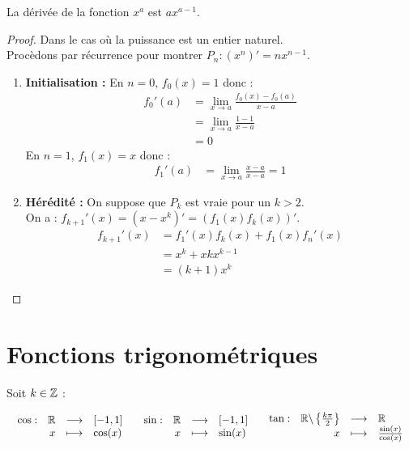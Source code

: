 \begin{proposition}
	La dérivée de la fonction $x^a$ est $ax^{a-1}$.
\end{proposition}

\begin{proof}
	Dans le cas où la puissance est un entier naturel. \\
	Procèdons par récurrence pour montrer $P_n : (x^n)' = nx^{n-1}$.
	\begin{enumerate}
		\item \textbf{Initialisation :} En $n = 0$, $f_0(x) = 1$ donc :
		\begin{align*}
			f_0'(a) &= \lim_{x \to a} \frac{f_0(x) - f_0(a)}{x - a} \\
			 &= \lim_{x \to a} \frac{1 - 1}{x - a} \\
			 &= 0
		\end{align*}
		En $n = 1$, $f_1(x) = x$ donc :
		\begin{align*}
			f_1'(a) &= \lim_{x \to a} \frac{x - a}{x - a} = 1
		\end{align*}
		\item \textbf{Hérédité :} On suppose que $P_k$ est vraie pour un $k > 2$. \\
		On a : $f_{k+1}'(x) = (x - x^k)' = (f_1(x) f_k(x))'$.
		\begin{align*}
			f_{k+1}'(x) &= f_1'(x) f_k(x) + f_1(x) f_n'(x) \\
			&= x^k + xkx^{k-1} \\
			&= (k+1)x^k 
		\end{align*}
	\end{enumerate}
\end{proof}

\section{Fonctions trigonométriques}
\begin{definition}
	Soit $k \in \mathbb{Z}$ :	
	\begin{center}
		$
		\begin{array}{ccc}
			\begin{array}{rrcl} \cos : & \mathbb{R} & \longrightarrow & [-1,1] \\ & x & \longmapsto & \cos(x) \end{array}
			&
			\begin{array}{rrcl} \sin : & \mathbb{R} & \longrightarrow & [-1,1] \\ & x & \longmapsto & \sin(x) \end{array}
			&
			\begin{array}{rrcl} \tan : & \mathbb{R} \backslash \left\{ \frac{k \pi}{2} \right\} & \longrightarrow & \mathbb{R} \\ & x & \longmapsto & \frac{\sin(x)}{\cos(x)} \end{array}
		\end{array}
		$
	\end{center}	
\end{definition}

